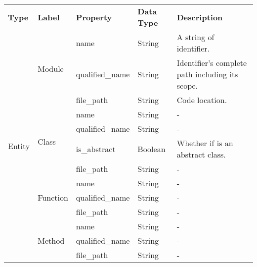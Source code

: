 \begin{tabular}{p{1.6cm}p{1.7cm}p{2cm}p{3.3cm}p{7.5cm}}
\toprule
\textbf{Type} & \textbf{Label} & \textbf{Property} & \textbf{Data Type} & \textbf{Description} \\
\cmidrule{1-1}\cmidrule{2-2}\cmidrule{3-3}\cmidrule{4-4}\cmidrule{5-5}
\multirow{13}{*}{Entity} & \multirow{3}{*}{Module} & name & String & A string of identifier. \\
\cmidrule{3-3}\cmidrule{4-4}\cmidrule{5-5}
 &  & qualified\_name & String & Identifier's complete path including its scope. \\
\cmidrule{3-3}\cmidrule{4-4}\cmidrule{5-5}
 &  & file\_path & String & Code location. \\
\cmidrule{2-2}\cmidrule{3-3}\cmidrule{4-4}\cmidrule{5-5}
 & \multirow{4}{*}{Class} & name & String & - \\
\cmidrule{3-3}\cmidrule{4-4}\cmidrule{5-5}
 &  & qualified\_name & String & - \\
\cmidrule{3-3}\cmidrule{4-4}\cmidrule{5-5}
 &  & is\_abstract & Boolean & Whether if is an abstract class. \\
\cmidrule{3-3}\cmidrule{4-4}\cmidrule{5-5}
 &  & file\_path & String & - \\
\cmidrule{2-2}\cmidrule{3-3}\cmidrule{4-4}\cmidrule{5-5}
 & \multirow{3}{*}{Function} & name & String & - \\
\cmidrule{3-3}\cmidrule{4-4}\cmidrule{5-5}
 &  & qualified\_name & String & - \\
\cmidrule{3-3}\cmidrule{4-4}\cmidrule{5-5}
 &  & file\_path & String & - \\
\cmidrule{2-2}\cmidrule{3-3}\cmidrule{4-4}\cmidrule{5-5}
 & \multirow{3}{*}{Method} & name & String & - \\
\cmidrule{3-3}\cmidrule{4-4}\cmidrule{5-5}
 &  & qualified\_name & String & - \\
\cmidrule{3-3}\cmidrule{4-4}\cmidrule{5-5}
 &  & file\_path & String & - \\
\bottomrule
\end{tabular}

